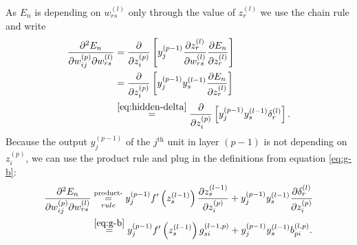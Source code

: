 As $E_n$ is depending on $w_{rs}^{(l)}$ only through the value of $z_r^{(l)}$ we use the chain rule and write
\begin{align}
\frac{\partial^2 E_n}{\partial w_{ij}^{(p)} \partial w_{rs}^{(l)}} & = \frac{\partial}{\partial z_i^{(p)}} \left[y_j^{(p - 1)} \frac{\partial z_r^{(l)}}{\partial w_{rs}^{(l)}} \frac{\partial E_n}{\partial z_r^{(l)}}\right]\notag\\
 & = \frac{\partial}{\partial z_i^{(p)}} \left[y_j^{(p - 1)}   y_s^{(l-1)}\frac{\partial E_n}{\partial z_r^{(l)}}\right]\notag\\
 & \overset{\eqref{eq:hidden-delta}}{=} \frac{\partial}{\partial z_i^{(p)}} \left[y_j^{(p - 1)} y_s^{(l-1)}\delta_r^{(l)}\right]\onedot
\end{align}
Because the output $y_j^{(p-1)}$ of the $j^\text{th}$ unit in layer $(p - 1)$ is not depending on $z_i^{(p)}$, we can use the product rule and plug in the definitions from equation \eqref{eq:g-b}:
\begin{align}
\label{eq:hessian-evaluation}
\frac{\partial^2 E_n}{\partial w_{ij}^{(p)} \partial w_{rs}^{(l)}} & \underset{rule}{\overset{\text{product-}}{=}} y_j^{(p-1)} f'\left(z_s^{(l-1)}\right) \frac{\partial z_s^{(l-1)}}{\partial z_i^{(p)}} + y_j^{(p-1)} y_s^{(l-1)} \frac{\partial \delta _r ^{(l)}}{\partial z_i ^{(p)}}\notag\\
& \overset{\eqref{eq:g-b}}{=} y_j^{(p-1)} f'\left(z_s^{(l-1)}\right) g_{si}^{(l-1,p)} + y_j^{(p-1)} y_s^{(l-1)} b_{pi}^{(l,p)}\onedot
\end{align}

